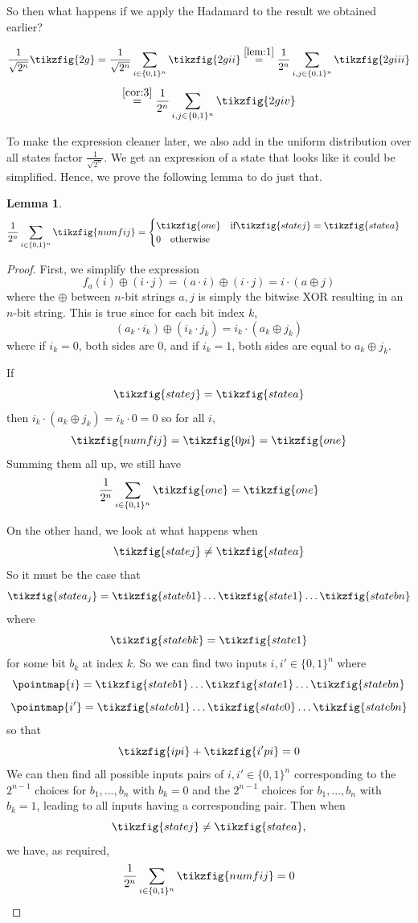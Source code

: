 \documentclass[11pt]{article} %
\theoremstyle{definition}
\newtheorem{lemma}[theorem]{Lemma}
\begin{document}
So then what happens if we apply the Hadamard to the result we obtained earlier?

\[\frac{1}{\sqrt{2^n}}\tikzfig{2g}=\frac{1}{\sqrt{2^n}}\sum_{i\in\{0,1\}^n}\tikzfig{2gii}
\stackrel{\ref{lem:1}}{=}\frac{1}{2^n}\sum_{i,j\in\{0,1\}^n}\tikzfig{2giii}\]
\[\stackrel{\ref{cor:3}}{=}\frac{1}{2^n}\sum_{i,j\in\{0,1\}^n}\tikzfig{2giv}\]

To make the expression cleaner later, 
we also add in the uniform distribution over all states factor $\frac{1}{\sqrt{2^n}}$.
We get an expression of a state that looks like it could be simplified.
Hence, we prove the following lemma to do just that.

\begin{lemma}
\[\frac{1}{2^n}\sum_{i\in\{0,1\}^n}\tikzfig{numfij}=
\begin{cases}
    \tikzfig{one} \quad\text{if} \tikzfig{statej}=\tikzfig{statea}\\
    0 \quad\text{otherwise}
\end{cases}
\]
\label{lem:2}
\end{lemma}

\begin{proof}

First, we simplify the expression
\[f_a(i)\oplus (i\cdot j)=(a\cdot i)\oplus (i \cdot j) = i\cdot (a \oplus j)\]
where the $\oplus$ between $n$-bit strings $a,j$ is simply the bitwise XOR resulting in an $n$-bit string.
This is true since for each bit index $k$,
\[(a_k \cdot i_k) \oplus (i_k \cdot j_k) = i_k \cdot (a_k \oplus j_k)\]
where if $i_k=0$, both sides are 0, and if $i_k=1$, both sides are equal to $a_k \oplus j_k$.

If 
\[\tikzfig{statej}=\tikzfig{statea}\]
then $i_k \cdot (a_k \oplus j_k) = i_k \cdot 0 = 0$ so for all $i$,
\[\tikzfig{numfij}=\tikzfig{0pi}=\tikzfig{one}\]
Summing them all up, we still have
\[\frac{1}{2^n}\sum_{i\in\{0,1\}^n}\tikzfig{one}=\tikzfig{one}\]

On the other hand, we look at what happens when 
\[\tikzfig{statej}\neq\tikzfig{statea}\]
So it must be the case that
\[\tikzfig{statea_j}=\tikzfig{stateb1}\dots\tikzfig{state1}\dots\tikzfig{statebn}\]
where
\[\tikzfig{statebk}=\tikzfig{state1}\]
for some bit $b_k$ at index $k$.
So we can find two inputs $i,i'\in\{0,1\}^n$ where
\[\pointmap{i} = \tikzfig{stateb1}\dots\tikzfig{state1}\dots\tikzfig{statebn}\]
\[\pointmap{i'} = \tikzfig{stateb1}\dots\tikzfig{state0}\dots\tikzfig{statebn}\]
so that
\[\tikzfig{ipi}+\tikzfig{i'pi} = 0\]
We can then find all possible inputs pairs of $i,i'\in\{0,1\}^n$ corresponding to the
$2^{n-1}$ choices for $b_1,...,b_n$ with $b_k=0$
and the $2^{n-1}$ choices for $b_1,...,b_n$ with $b_k=1$,
leading to all inputs having a corresponding pair. 
Then when
\[\tikzfig{statej}\neq\tikzfig{statea},\]
we have, as required,
\[\frac{1}{2^n}\sum_{i\in\{0,1\}^n}\tikzfig{numfij}=0\]

\end{proof}
\end{document}
